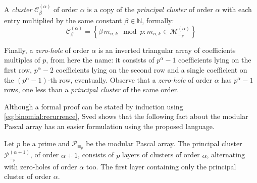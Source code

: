 A \emph{cluster} $\mathcal{C}_{\beta}^{(\alpha)}$ of order $\alpha$ is a copy of the \emph{principal cluster}
of order $\alpha$ with each entry multiplied 
by the same constant $\beta\in\mathbb{N}$, formally:
\begin{displaymath}
    \mathcal{C}_{\beta}^{(\alpha)}=\left\lbrace \beta\,m_{n,k}\mod p:m_{n,k}\in \mathcal{M}_{\equiv_{p}}^{(\alpha)}\right\rbrace
\end{displaymath}

Finally, a \emph{zero-hole} of order $\alpha$ is an inverted triangular array of
coefficients multiples of $p$, from here the name: it consists of $p^{\alpha}-1$
coefficients lying on the first row, $p^{\alpha}-2$ coefficients lying on the second row
and a single coefficient on the $(p^{\alpha}-1)$-th row, eventually. 
Observe that a \emph{zero-hole} of order $\alpha$ has $p^{\alpha}-1$ rows, one less
than a \emph{principal cluster} of the same order.

Although a formal proof can be stated by induction using
\autoref{eq:binomial:recurrence}, Sved shows that the following fact 
about the modular Pascal array has an easier formulation using the proposed language.

\begin{theorem}
    Let $p$ be a prime and $\mathcal{P}_{\equiv_{p}}$ be the 
    modular Pascal array. The principal cluster $\mathcal{P}_{\equiv_{p}}^{(\alpha+1)}$,
    of order $\alpha + 1$, consists of $p$ layers of clusters of order $\alpha$, alternating
    with zero-holes of order $\alpha$ too. The first layer containing only the principal
    cluster of order $\alpha$.
\end{theorem}

